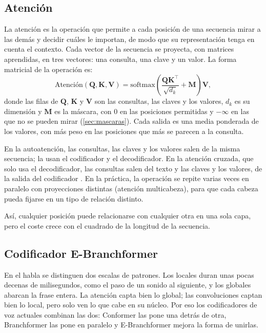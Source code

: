 \subsection{Atención}
\label{sec:atencion}

La atención es la operación que permite a cada posición de una secuencia mirar a las demás y decidir cuáles le importan, de modo que su representación tenga en cuenta el contexto. Cada vector de la secuencia se proyecta, con matrices aprendidas, en tres vectores: una consulta, una clave y un valor. La forma matricial de la operación es:
\begin{equation}
  \text{Atención}(\mathbf{Q}, \mathbf{K}, \mathbf{V}) = \mathrm{softmax}\!\left( \frac{\mathbf{Q}\mathbf{K}^{\top}}{\sqrt{d_k}} + \mathbf{M} \right) \mathbf{V},
  \label{eq:atencion}
\end{equation}
donde las filas de $\mathbf{Q}$, $\mathbf{K}$ y $\mathbf{V}$ son las consultas, las claves y los valores, $d_k$ es su dimensión y $\mathbf{M}$ es la máscara, con $0$ en las posiciones permitidas y $-\infty$ en las que no se pueden mirar (\cref{sec:mascaras}). Cada salida es una media ponderada de los valores, con más peso en las posiciones que más se parecen a la consulta.

En la autoatención, las consultas, las claves y los valores salen de la misma secuencia; la usan el codificador y el decodificador. En la atención cruzada, que solo usa el decodificador, las consultas salen del texto y las claves y los valores, de la salida del codificador \cite{vaswani2017attention}. En la práctica, la operación se repite varias veces en paralelo con proyecciones distintas (atención multicabeza), para que cada cabeza pueda fijarse en un tipo de relación distinto.

Así, cualquier posición puede relacionarse con cualquier otra en una sola capa, pero el coste crece con el cuadrado de la longitud de la secuencia.

\subsection{Codificador E-Branchformer}
\label{sec:ebranchformer}

En el habla se distinguen dos escalas de patrones. Los locales duran unas pocas decenas de milisegundos, como el paso de un sonido al siguiente, y los globales abarcan la frase entera. La atención capta bien lo global; las convoluciones captan bien lo local, pero solo ven lo que cabe en su núcleo. Por eso los codificadores de voz actuales combinan las dos: Conformer \cite{gulati2020conformer} las pone una detrás de otra, Branchformer \cite{peng2022branchformer} las pone en paralelo y E-Branchformer \cite{kim2023ebranchformer} mejora la forma de unirlas.

